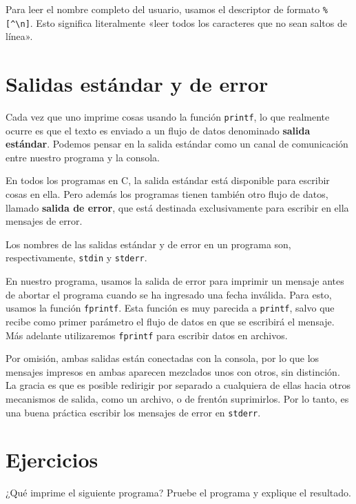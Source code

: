 Para leer el nombre completo del usuario, usamos el descriptor de
formato \lstinline!%[^\n]!. Esto significa literalmente «leer todos los
caracteres que no sean saltos de línea».

\section{Salidas estándar y de error}

Cada vez que uno imprime cosas usando la función \lstinline!printf!, lo
que realmente ocurre es que el texto es enviado a un flujo de datos
denominado \textbf{salida estándar}. Podemos pensar en la salida
estándar como un canal de comunicación entre nuestro programa y la
consola.

En todos los programas en C, la salida estándar está disponible para
escribir cosas en ella. Pero además los programas tienen también otro
flujo de datos, llamado \textbf{salida de error}, que está destinada
exclusivamente para escribir en ella mensajes de error.

Los nombres de las salidas estándar y de error en un programa son,
respectivamente, \lstinline!stdin! y \lstinline!stderr!.

En nuestro programa, usamos la salida de error para imprimir un mensaje
antes de abortar el programa cuando se ha ingresado una fecha inválida.
Para esto, usamos la función \lstinline!fprintf!. Esta función es muy
parecida a \lstinline!printf!, salvo que recibe como primer parámetro el
flujo de datos en que se escribirá el mensaje. Más adelante utilizaremos
\lstinline!fprintf! para escribir datos en archivos.

Por omisión, ambas salidas están conectadas con la consola, por lo que
los mensajes impresos en ambas aparecen mezclados unos con otros, sin
distinción. La gracia es que es posible redirigir por separado a
cualquiera de ellas hacia otros mecanismos de salida, como un archivo, o
de frentón suprimirlos. Por lo tanto, es una buena práctica escribir los
mensajes de error en \lstinline!stderr!.

\section{Ejercicios}

¿Qué imprime el siguiente programa? Pruebe el programa y explique el
resultado.
